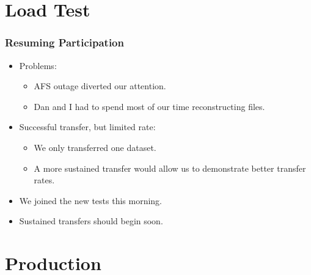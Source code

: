 \documentclass{beamer}
\begin{document}
\section{Load Test}
\begin{frame}
    \frametitle{Resuming Participation}
    \begin{itemize}
        \item Problems:
        \begin{itemize}
            \item AFS outage diverted our attention.
            \item Dan and I had to spend most of our time reconstructing files.
        \end{itemize}
        \item Successful transfer, but limited rate:
        \begin{itemize}
            \item We only transferred one dataset.
            \item A more sustained transfer would allow us to demonstrate better transfer rates.
        \end{itemize}
        \item We joined the new tests this morning.
        \item Sustained transfers should begin soon.
    \end{itemize}
\end{frame}

\section{Production}
\begin{frame}
    \frametitle{}
\end{frame}
\end{document}
